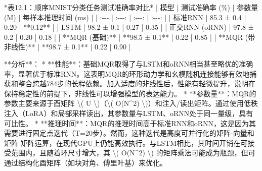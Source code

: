 \documentclass[
  12pt,
]{article}
\newenvironment{Shaded}{}{}
\newcommand{\DecValTok}[1]{\textcolor[rgb]{0.25,0.63,0.44}{#1}}
\newcommand{\FloatTok}[1]{\textcolor[rgb]{0.25,0.63,0.44}{#1}}
\newcommand{\NormalTok}[1]{#1}
\newcommand{\OperatorTok}[1]{\textcolor[rgb]{0.40,0.40,0.40}{#1}}
\begin{document}
\begin{Shaded}
\begin{Highlighting}[]
\OperatorTok{*}\NormalTok{表}\FloatTok{12.1}\NormalTok{：顺序MNIST分类任务测试准确率对比}\OperatorTok{*}
\OperatorTok{|}\NormalTok{ 模型 }\OperatorTok{|}\NormalTok{ 测试准确率 (}\OperatorTok{\%}\NormalTok{) }\OperatorTok{|}\NormalTok{ 参数量 (M) }\OperatorTok{|}\NormalTok{ 每样本推理时间 (ms) }\OperatorTok{|}
\OperatorTok{|}\NormalTok{ :}\OperatorTok{{-}{-}{-}} \OperatorTok{|}\NormalTok{ :}\OperatorTok{{-}{-}{-}}\NormalTok{: }\OperatorTok{|}\NormalTok{ :}\OperatorTok{{-}{-}{-}}\NormalTok{: }\OperatorTok{|}\NormalTok{ :}\OperatorTok{{-}{-}{-}}\NormalTok{: }\OperatorTok{|}
\OperatorTok{|}\NormalTok{ 标准RNN }\OperatorTok{|} \FloatTok{85.3}\NormalTok{ ± }\FloatTok{0.4} \OperatorTok{|} \FloatTok{0.20} \OperatorTok{|} \OperatorTok{**}\FloatTok{0.12}\OperatorTok{**} \OperatorTok{|}
\OperatorTok{|}\NormalTok{ LSTM }\OperatorTok{|} \FloatTok{98.2}\NormalTok{ ± }\FloatTok{0.1} \OperatorTok{|} \FloatTok{0.27} \OperatorTok{|} \FloatTok{0.35} \OperatorTok{|}
\OperatorTok{|}\NormalTok{ 正交RNN (oRNN) }\OperatorTok{|} \FloatTok{97.8}\NormalTok{ ± }\FloatTok{0.2} \OperatorTok{|} \FloatTok{0.20} \OperatorTok{|} \FloatTok{0.18} \OperatorTok{|}
\OperatorTok{|} \OperatorTok{**}\NormalTok{MQR (基础)}\OperatorTok{**} \OperatorTok{|} \OperatorTok{**}\FloatTok{98.5}\NormalTok{ ± }\FloatTok{0.1}\OperatorTok{**} \OperatorTok{|} \FloatTok{0.22} \OperatorTok{|} \FloatTok{0.85} \OperatorTok{|}
\OperatorTok{|} \OperatorTok{**}\NormalTok{MQR (带非线性)}\OperatorTok{**} \OperatorTok{|} \OperatorTok{**}\FloatTok{98.7}\NormalTok{ ± }\FloatTok{0.1}\OperatorTok{**} \OperatorTok{|} \FloatTok{0.22} \OperatorTok{|} \FloatTok{0.90} \OperatorTok{|}

\OperatorTok{**}\NormalTok{分析}\OperatorTok{**}\NormalTok{：}
\OperatorTok{*}   \OperatorTok{**}\NormalTok{性能}\OperatorTok{**}\NormalTok{：基础MQR取得了与LSTM和oRNN相当甚至略优的准确率，显著优于标准RNN。这表明MQR的环形动力学和幺模随机连接能够有效地捕获和整合跨越}\DecValTok{784}\NormalTok{步的长程依赖。加入适度的非线性后，性能有轻微提升，说明在保持稳定性的前提下，非线性可以增强模型的表达能力。}
\OperatorTok{*}   \OperatorTok{**}\NormalTok{参数量}\OperatorTok{**}\NormalTok{：MQR的参数主要来源于酉矩阵 }\OperatorTok{\textbackslash{}}\NormalTok{( U }\OperatorTok{\textbackslash{}}\NormalTok{)（}\OperatorTok{\textbackslash{}}\NormalTok{( O(N}\OperatorTok{\^{}}\DecValTok{2}\NormalTok{) }\OperatorTok{\textbackslash{}}\NormalTok{)）和注入}\OperatorTok{/}\NormalTok{读出矩阵。通过使用低秩注入（LoRA）和局部采样读出，其参数量与LSTM、oRNN处于同一量级，具有可比性。}
\OperatorTok{*}   \OperatorTok{**}\NormalTok{推理时间}\OperatorTok{**}\NormalTok{：MQR的推理时间高于标准RNN和oRNN，这是因为其需要进行固定点迭代（T}\OperatorTok{=}\DecValTok{20}\NormalTok{步）。然而，这种迭代是高度可并行化的矩阵}\OperatorTok{{-}}\NormalTok{向量和矩阵}\OperatorTok{{-}}\NormalTok{矩阵运算，在现代GPU上仍能高效执行。与LSTM相比，其时间开销在可接受范围内，且随着环尺寸增大，其 }\OperatorTok{\textbackslash{}}\NormalTok{( O(N}\OperatorTok{\^{}}\DecValTok{2}\NormalTok{) }\OperatorTok{\textbackslash{}}\NormalTok{) 的矩阵乘法可能成为瓶颈，但可通过结构化酉矩阵（如块对角、傅里叶基）来优化。}


\end{Highlighting}
\end{Shaded}
\end{document}
